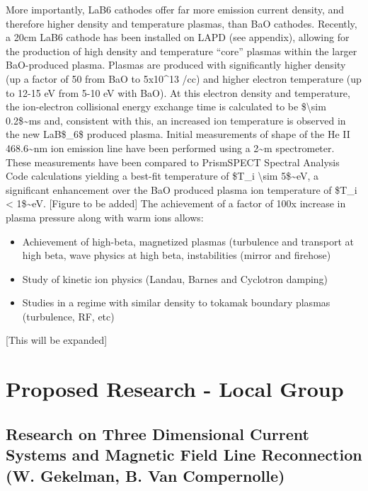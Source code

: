 \documentclass[11pt]{article}
\begin{document}
More importantly, LaB6 cathodes offer far more emission current density,
and therefore higher density and temperature plasmas, than BaO cathodes.
Recently, a 20cm LaB6 cathode has been installed on LAPD (see appendix),
allowing for the production of high density and temperature ``core''
plasmas within the larger BaO-produced plasma. Plasmas are produced with
significantly higher density (up a factor of 50 from BaO to 5x10\^{}13
/cc) and higher electron temperature (up to 12-15 eV from 5-10 eV with
BaO). At this electron density and temperature, the ion-electron
collisional energy exchange time is calculated to be
\$\textbackslash{}sim 0.2\$\textasciitilde{}ms and, consistent with
this, an increased ion temperature is observed in the new LaB\$\_6\$
produced plasma. Initial measurements of shape of the He II
468.6\textasciitilde{}nm ion emission line have been performed using a
2\textasciitilde{}m spectrometer. These measurements have been compared
to PrismSPECT Spectral Analysis Code calculations yielding a best-fit
temperature of \$T\_i \textbackslash{}sim 5\$\textasciitilde{}eV, a
significant enhancement over the BaO produced plasma ion temperature of
\$T\_i \textless{} 1\$\textasciitilde{}eV. {[}Figure to be added{]} The
achievement of a factor of 100x increase in plasma pressure along with
warm ions allows:


\begin{itemize}
\item
  Achievement of high-beta, magnetized plasmas (turbulence and transport
  at high beta, wave physics at high beta, instabilities (mirror and
  firehose)
\item
  Study of kinetic ion physics (Landau, Barnes and Cyclotron damping)
\item
  Studies in a regime with similar density to tokamak boundary plasmas
  (turbulence, RF, etc)
\end{itemize}


{[}This will be expanded{]}

\section{Proposed Research - Local Group}


\subsection{Research on Three Dimensional Current Systems and Magnetic Field
Line Reconnection (W. Gekelman, B. Van Compernolle)}
\end{document}
